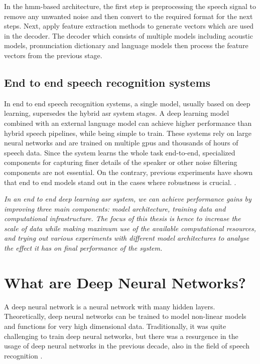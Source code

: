 In the \acrshort{hmm}-based architecture, the first step is preprocessing the speech signal to remove any unwanted noise and then convert to the required format for the next steps. Next, apply feature extraction methods to generate vectors which are used in the decoder. The decoder which consists of multiple models including acoustic models, pronunciation dictionary and language models then process the feature vectors from the previous stage.

\subsection{End to end speech recognition systems}
\label{section:e2easr}
In end to end speech recognition systems, a single model, usually based on deep learning, supersedes the hybrid \acrshort{asr} system stages. A deep learning model combined with an external language model can achieve higher performance than hybrid speech pipelines, while being simple to train. These systems rely on large neural networks and are trained on multiple \acrshort{gpu}s and thousands of hours of speech data. Since the system learns the whole task end-to-end, specialized components for capturing finer details of the speaker or other noise filtering components are not essential. On the contrary, previous experiments have shown that end to end models stand out in the cases where robustness is crucial. \cite{Hannun2014DeepRecognition}. 

\emph{In an end to end deep learning \acrshort{asr} system, we can achieve performance gains by improving three main components: model architecture, training data and computational infrastructure. The focus of this thesis is hence to increase the scale of data while making maximum use of the available computational resources, and trying out various experiments with different model architectures to analyse the effect it has on final performance of the system.}

\section{What are Deep Neural Networks?}
A deep neural network is a neural network with many hidden layers. Theoretically, deep neural networks can be trained to model non-linear models and functions for very high dimensional data. Traditionally, it was quite challenging to train deep neural networks, but there was a resurgence in the usage of deep neural networks in the previous decade, also in the field of speech recognition \cite{Dahl2012Context-DependentRecognition, Morgan2012DeepRecognition, Deng2013RECENTMICROSOFT, Hannun2014DeepRecognition}. 

